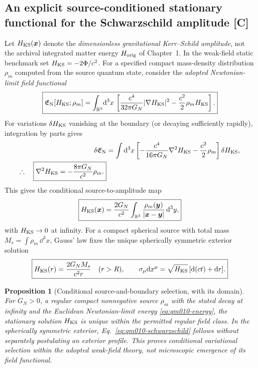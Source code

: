\documentclass[11pt,a4paper]{article}
\newtheorem{proposition}{Proposition}[section]\newtheorem{lemma}[proposition]{Lemma}\newtheorem{definition}[proposition]{Definition}\newtheorem{remark}[proposition]{Remark}
\begin{document}
\subsection{An explicit source-conditioned stationary functional for the Schwarzschild amplitude [C]}\label{sec:qm010-H}
Let $H_{\rm KS}(\bm x)$ denote the \emph{dimensionless gravitational Kerr--Schild amplitude}, not the archival integrated matter energy $H_{\rm orig}$ of Chapter~1. In the weak-field static benchmark set $H_{\rm KS}=-2\Phi/c^2$. For a specified compact mass-density distribution $\rho_m$ computed from the source quantum state, consider the \emph{adopted Newtonian-limit field functional}
\begin{equation}\label{eq:qm010-energy}
\boxed{\mathfrak E_{\rm N}[H_{\rm KS};\rho_m]
=\int_{\mathbb R^3}\!\mathrm d^3x\,
\left[\frac{c^4}{32\pi G_N}|\nabla H_{\rm KS}|^2
-\frac{c^2}{2}\rho_m H_{\rm KS}\right].}\end{equation}
For variations $\delta H_{\rm KS}$ vanishing at the boundary (or decaying sufficiently rapidly), integration by parts gives
\begin{align}
\delta\mathfrak E_{\rm N}
&=\int\mathrm d^3x\left[-\frac{c^4}{16\pi G_N}\nabla^2H_{\rm KS}-\frac{c^2}{2}\rho_m\right]\delta H_{\rm KS},\label{eq:qm010-firstvar}\\
\therefore\quad\boxed{\nabla^2H_{\rm KS}=-\frac{8\pi G_N}{c^2}\rho_m.}\label{eq:qm010-poisson}
\end{align}
This gives the conditional source-to-amplitude map
\begin{equation}\label{eq:qm010-solution}
\boxed{H_{\rm KS}(\bm x)=\frac{2G_N}{c^2}\int_{\mathbb R^3}
\frac{\rho_m(\bm y)}{|\bm x-\bm y|}\,\mathrm d^3y,}
\end{equation}
with $H_{\rm KS}\to0$ at infinity. For a compact spherical source with total mass $M_s=\int\rho_m\,\dd^3x$, Gauss' law fixes the unique spherically symmetric exterior solution
\begin{equation}\label{eq:qm010-schwarzschild}
\boxed{H_{\rm KS}(r)=\frac{2G_NM_s}{c^2r}\quad(r>R),\qquad
\sigma_\mu\mathrm d x^\mu=\sqrt{H_{\rm KS}}\,[\mathrm d(ct)+\mathrm d r].}
\end{equation}
\begin{proposition}[Conditional source-and-boundary selection, with its domain]\label{prop:qm010-unique}
For $G_N>0$, a regular compact nonnegative source $\rho_m$ with the stated decay at infinity and the Euclidean Newtonian-limit energy \eqref{eq:qm010-energy}, the stationary solution $H_{\rm KS}$ is unique within the permitted regular field class. In the spherically symmetric exterior, Eq.~\eqref{eq:qm010-schwarzschild} follows without separately postulating an exterior profile. This proves \emph{conditional} variational selection within the adopted weak-field theory, not microscopic emergence of its field functional.
\end{proposition}
\end{document}
